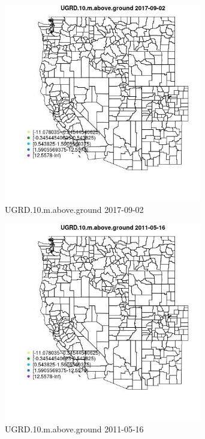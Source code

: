 \begin{figure} 
\centering  
\includegraphics[width=0.77\textwidth]{Code_Outputs/Report_ML_input_PM25_Step4_part_e_de_duplicated_aveswNAs_MapObsUGRD10maboveground2017-09-02.jpg} 
\caption{\label{fig:Report_ML_input_PM25_Step4_part_e_de_duplicated_aveswNAsMapObsUGRD10maboveground2017-09-02}UGRD.10.m.above.ground 2017-09-02} 
\end{figure} 
 

\begin{figure} 
\centering  
\includegraphics[width=0.77\textwidth]{Code_Outputs/Report_ML_input_PM25_Step4_part_e_de_duplicated_aveswNAs_MapObsUGRD10maboveground2011-05-16.jpg} 
\caption{\label{fig:Report_ML_input_PM25_Step4_part_e_de_duplicated_aveswNAsMapObsUGRD10maboveground2011-05-16}UGRD.10.m.above.ground 2011-05-16} 
\end{figure} 
 

